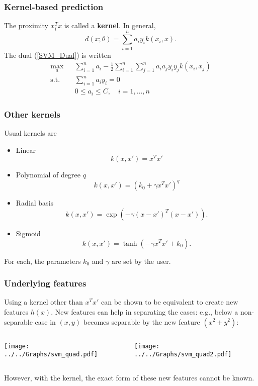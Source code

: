 \begin{frame}
\frametitle{Kernel-based prediction}
The proximity $x_i^Tx$ is called a {\bf kernel}. In general,
$$
d(x;\theta) = \sum_{i=1}^n a_i y_i k(x_i,x).
$$
The dual (\ref{SVM_Dual}) is written
\begin{eqnarray*}
\nonumber \max_{a} &&   \sum_{i=1}^n a_i - \frac{1}{2}\sum_{i=1}^n\sum_{j=1}^n a_i a_j y_iy_j k(x_i,x_j)\\
\mbox{s.t. } && \sum_{i=1}^n a_i y_i = 0\\
\nonumber && 0 \leq a_i \leq C, \quad i=1,\ldots ,n
\end{eqnarray*}
\end{frame}
\begin{frame}
\frametitle{Other kernels}
Usual kernels are 
\begin{itemize}
\item Linear
$$
k(x,x') = x^Tx'
$$
\item Polynomial of degree $q$
$$
k(x,x') = \left(k_0 + \gamma x^Tx'\right)^q
$$
\item Radial basis
$$
k(x,x') = \exp\left(-\gamma (x-x')^T(x-x')\right).
$$
\item Sigmoid
$$
k(x,x') = \tanh\left(-\gamma x^Tx' + k_0\right).
$$
\end{itemize}
For each, the parameters $k_0$ and $\gamma$ are set by the user.
\end{frame}
\begin{frame}
\frametitle{Underlying features}
Using a kernel other than $x^Tx'$ can be shown to be equivalent to create new features $h(x)$. New features can help in separating the cases: e.g., below a non-separable case in $(x,y)$ becomes separable by the new feature $(x^2+y^2)$:\\
\vspace{0.3cm}

\begin{columns}
\begin{column}{0.66\linewidth}
\texttt{[image: ../../Graphs/svm\_quad.pdf]} 
\end{column}
\begin{column}{0.34\linewidth}
\hspace{-1cm}
\texttt{[image: ../../Graphs/svm\_quad2.pdf]} 
\vspace{0.2cm}
\end{column}
\end{columns}
However, with the kernel, the exact form of these new features cannot be known.
\end{frame}
